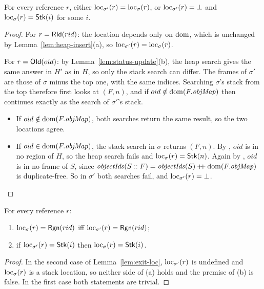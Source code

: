 \begin{lemma}
\label{lem:exit-loc}
For every reference $r$, either $\mathrm{loc}_{\sigma'}(r) = \mathrm{loc}_{\sigma}(r)$, or $\mathrm{loc}_{\sigma'}(r) = \bot$
and $\mathrm{loc}_{\sigma}(r) = \mathsf{Stk}(i)$ for some $i$.
\end{lemma}
\begin{proof}
For $r = \mathsf{RId}(rid)$: the location depends only on $\mathrm{dom}$, which is unchanged by
Lemma~\ref{lem:heap-insert}(a), so $\mathrm{loc}_{\sigma'}(r) = \mathrm{loc}_{\sigma}(r)$.

For $r = \mathsf{OId}(oid)$: by Lemma~\ref{lem:status-update}(b), the heap search gives the same answer in
$H'$ as in $H$, so only the stack search can differ. The frames of $\sigma'$ are those of $\sigma$
minus the top one, with the same indices. Searching $\sigma$'s stack from the top therefore first
looks at $(F, n)$, and if $oid \notin \mathrm{dom}(F.\mathit{objMap})$ then continues exactly as the search of
$\sigma'$'s stack.
\begin{itemize}[nosep]
  \item If $oid \notin \mathrm{dom}(F.\mathit{objMap})$, both searches return the same result, so the two locations
    agree.
  \item If $oid \in \mathrm{dom}(F.\mathit{objMap})$, the stack search in $\sigma$ returns $(F, n)$. By ,
    $oid$ is in no region of $H$, so the heap search fails and $\mathrm{loc}_{\sigma}(r) = \mathsf{Stk}(n)$. Again by
    , $oid$ is in no frame of $S$, since $\mathit{objectIds}(S :: F) = \mathit{objectIds}(S) \mathbin{+\!\!+} \mathrm{dom}(F.\mathit{objMap})$ is
    duplicate-free. So in $\sigma'$ both searches fail, and $\mathrm{loc}_{\sigma'}(r) = \bot$. \qedhere
\end{itemize}
\end{proof}

\begin{corollary}
\label{cor:exit-loc}
For every reference $r$:
\begin{enumerate}[nosep,label=(\alph*)]
  \item $\mathrm{loc}_{\sigma}(r) = \mathsf{Rgn}(rid)$ iff $\mathrm{loc}_{\sigma'}(r) = \mathsf{Rgn}(rid)$;
  \item if $\mathrm{loc}_{\sigma'}(r) = \mathsf{Stk}(i)$ then $\mathrm{loc}_{\sigma}(r) = \mathsf{Stk}(i)$.
\end{enumerate}
\end{corollary}
\begin{proof}
In the second case of Lemma~\ref{lem:exit-loc}, $\mathrm{loc}_{\sigma'}(r)$ is undefined and
$\mathrm{loc}_{\sigma}(r)$ is a stack location, so neither side of (a) holds and the premise of (b) is false.
In the first case both statements are trivial.
\end{proof}

